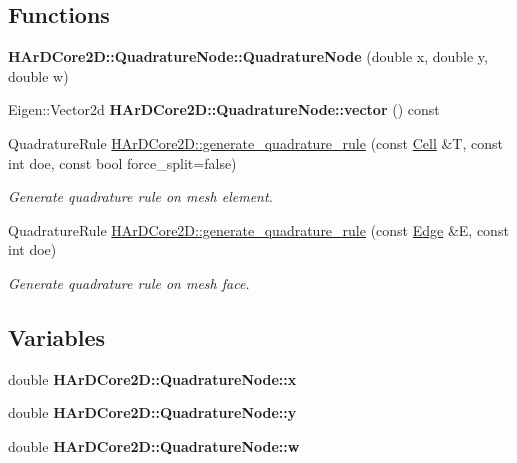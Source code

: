 \subsection*{Functions}
\begin{DoxyCompactItemize}
\item 
\mbox{\label{group__Quadratures_gae76e5c50d31061d72d153133718428bb}} 
{\bfseries H\+Ar\+D\+Core2\+D\+::\+Quadrature\+Node\+::\+Quadrature\+Node} (double x, double y, double w)
\item 
\mbox{\label{group__Quadratures_ga27f8f3696a0be686ed1606dda2425da6}} 
Eigen\+::\+Vector2d {\bfseries H\+Ar\+D\+Core2\+D\+::\+Quadrature\+Node\+::vector} () const
\item 
Quadrature\+Rule \hyperlink{group__Quadratures_gad8f643134b5bea1e323e14c5ac42aa74}{H\+Ar\+D\+Core2\+D\+::generate\+\_\+quadrature\+\_\+rule} (const \hyperlink{classHArDCore2D_1_1Cell}{Cell} \&T, const int doe, const bool force\+\_\+split=false)
\begin{DoxyCompactList}\small\item\em Generate quadrature rule on mesh element. \end{DoxyCompactList}\item 
Quadrature\+Rule \hyperlink{group__Quadratures_ga5e1f7c48ac0530bcb24e590a729bf3db}{H\+Ar\+D\+Core2\+D\+::generate\+\_\+quadrature\+\_\+rule} (const \hyperlink{classHArDCore2D_1_1Edge}{Edge} \&E, const int doe)
\begin{DoxyCompactList}\small\item\em Generate quadrature rule on mesh face. \end{DoxyCompactList}\end{DoxyCompactItemize}
\subsection*{Variables}
\begin{DoxyCompactItemize}
\item 
\mbox{\label{group__Quadratures_ga628eb81f57259847bbc6250bc2fc7a47}} 
double {\bfseries H\+Ar\+D\+Core2\+D\+::\+Quadrature\+Node\+::x}
\item 
\mbox{\label{group__Quadratures_gabd7b50c9a348283e18d94c9e4dba8982}} 
double {\bfseries H\+Ar\+D\+Core2\+D\+::\+Quadrature\+Node\+::y}
\item 
\mbox{\label{group__Quadratures_ga5ff899e851df60680e721740e4176fc0}} 
double {\bfseries H\+Ar\+D\+Core2\+D\+::\+Quadrature\+Node\+::w}
\end{DoxyCompactItemize}


